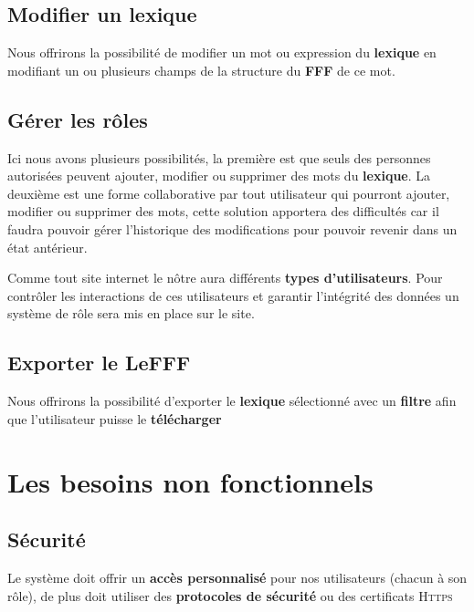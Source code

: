 \documentclass[a4paper, 12pt]{article}
\begin{document}
\subsection{Modifier un lexique}
 
{Nous offrirons la possibilité de modifier un mot ou expression du \textbf{lexique} en modifiant un ou plusieurs champs de la structure du \textbf{FFF} de ce mot.\par}
 
\subsection{Gérer les rôles}

{Ici nous avons plusieurs possibilités, la première est que seuls des personnes autorisées peuvent ajouter, modifier ou supprimer des mots du \textbf{lexique}. La deuxième est une forme collaborative par tout utilisateur qui pourront ajouter, modifier ou supprimer des mots, cette solution apportera des difficultés car il faudra pouvoir gérer l'historique des modifications pour pouvoir revenir dans un état antérieur.\par}

Comme tout site internet le nôtre aura différents \textbf{types d'utilisateurs}. Pour contrôler les interactions de ces utilisateurs et garantir l'intégrité des données un système de rôle sera mis en place sur le site.
 
 \subsection{Exporter le LeFFF}

{Nous offrirons la possibilité d'exporter le \textbf{lexique} sélectionné avec un \textbf{filtre} afin que l'utilisateur puisse le \textbf{télécharger}\par}

\section{Les besoins non fonctionnels}

\subsection{Sécurité}
{Le système doit offrir un \textbf{accès personnalisé} pour nos utilisateurs (chacun à son rôle), de plus doit utiliser des \textbf{protocoles de sécurité} ou des certificats \textsc{Https} }
\end{document}
